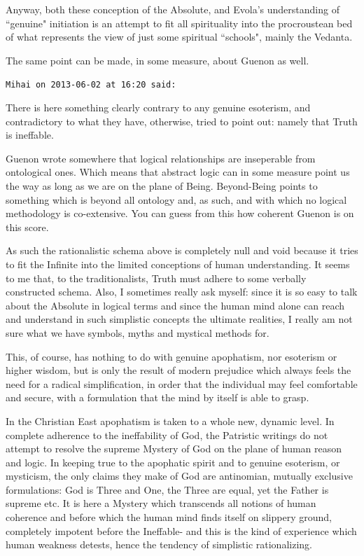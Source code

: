 \begin{footnotesize}
\begin{sffamily}
Anyway, both these conception of the Absolute, and Evola's understanding of ``genuine" initiation is an attempt to fit all spirituality into the procroustean bed of what represents the view of just some spiritual ``schools", mainly the Vedanta.

The same point can be made, in some measure, about Guenon as well.


\hfill

\texttt{Mihai on 2013-06-02 at 16:20 said: }

There is here something clearly contrary to any genuine esoterism, and contradictory to what they have, otherwise, tried to point out: namely that Truth is ineffable.

Guenon wrote somewhere that logical relationships are inseperable from ontological ones. Which means that abstract logic can in some measure point us the way as long as we are on the plane of Being. Beyond-Being points to something which is beyond all ontology and, as such, and with which no logical methodology is co-extensive. You can guess from this how coherent Guenon is on this score. 

As such the rationalistic schema above is completely null and void because it tries to fit the Infinite into the limited conceptions of human understanding. It seems to me that, to the traditionalists, Truth must adhere to some verbally constructed schema. Also, I sometimes really ask myself: since it is so easy to talk about the Absolute in logical terms and since the human mind alone can reach and understand in such simplistic concepts the ultimate realities, I really am not sure what we have symbols, myths and mystical methods for. 

This, of course, has nothing to do with genuine apophatism, nor esoterism or higher wisdom, but is only the result of modern prejudice which always feels the need for a radical simplification, in order that the individual may feel comfortable and secure, with a formulation that the mind by itself is able to grasp.

In the Christian East apophatism is taken to a whole new, dynamic level. In complete adherence to the ineffability of God, the Patristic writings do not attempt to resolve the supreme Mystery of God on the plane of human reason and logic. In keeping true to the apophatic spirit and to genuine esoterism, or mysticism, the only claims they make of God are antinomian, mutually exclusive formulations: God is Three and One, the Three are equal, yet the Father is supreme etc. It is here a Mystery which transcends all notions of human coherence and before which the human mind finds itself on slippery ground, completely impotent before the Ineffable- and this is the kind of experience which human weakness detests, hence the tendency of simplistic rationalizing.


\end{sffamily}
\end{footnotesize}

